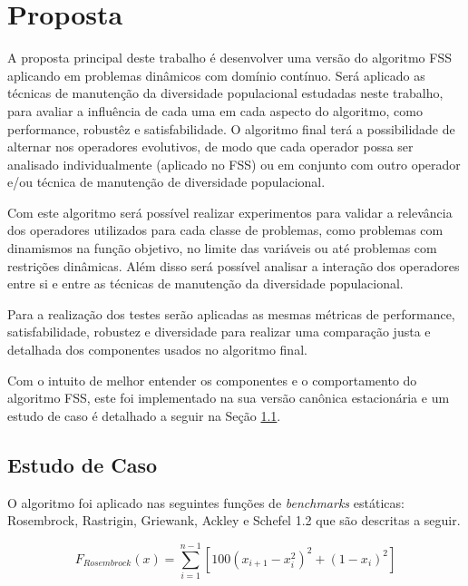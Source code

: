 \chapter{Proposta}
\label{ch:proposta}

A proposta principal deste trabalho é desenvolver uma versão do algoritmo FSS aplicando em problemas dinâmicos com domínio contínuo. Será aplicado as técnicas de manutenção da diversidade populacional estudadas neste trabalho, para avaliar a influência de cada uma em cada aspecto do algoritmo, como performance, robustêz e satisfabilidade. O algoritmo final terá a possibilidade de alternar nos operadores evolutivos, de modo que cada operador possa ser analisado individualmente (aplicado no FSS) ou em conjunto com outro operador e/ou técnica de manutenção de diversidade populacional.

Com este algoritmo será possível realizar experimentos para validar a relevância dos operadores utilizados para cada classe de problemas, como problemas com dinamismos na função objetivo, no limite das variáveis ou até problemas com restrições dinâmicas. Além disso será possível analisar a interação dos operadores entre si e entre as técnicas de manutenção da diversidade populacional.

Para a realização dos testes serão aplicadas as mesmas métricas de performance, satisfabilidade, robustez e diversidade para realizar uma comparação justa e detalhada dos componentes usados no algoritmo final. 

Com o intuito de melhor entender os componentes e o comportamento do algoritmo FSS, este foi implementado na sua versão canônica estacionária e um estudo de caso é detalhado a seguir na Seção \ref{sec:test_case}.

\section{Estudo de Caso}
\label{sec:test_case}

O algoritmo foi aplicado nas seguintes funções de \textit{benchmarks} estáticas: Rosembrock, Rastrigin, Griewank, Ackley e Schefel 1.2 que são descritas a seguir.

\begin{equation}
\label{eq:rosembrock}
F_{Rosembrock}(x) = \sum_{i=1}^{n-1} \left[ 100 (x_{i+1} - x_i^2)^2 + (1 - x_i)^2\right]
\end{equation}

